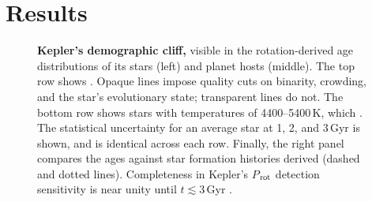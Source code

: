 \documentclass[11pt,twocolumn,tighten]{aastex63}
\begin{document}
\section{Results}
\label{sec:results}

\begin{figure}[!t]
  \begin{center}
    \leavevmode

	\vspace{-0.35cm}
  \end{center}
  \vspace{-0.6cm}
  \caption{{\bf Kepler's demographic cliff,} visible in the
  rotation-derived age distributions of its stars (left) and planet
  hosts (middle).  The top row shows .  Opaque lines
  impose quality cuts on binarity, crowding, and the star's
  evolutionary state; transparent lines do not.  The bottom row shows
  stars with temperatures of 4400--5400\,K, which .  The
  statistical uncertainty for an average star at 1, 2, and 3\,Gyr is
  shown, and is identical across each
  row.  
  Finally, the right panel compares the  ages
  against star formation histories derived  (dashed
  and dotted lines).  Completeness in Kepler's $P$$_{\rm rot}$
  detection sensitivity is near unity until $t$$\lesssim$3\,Gyr
  \citep{2022ApJ...937...94M}.
  \label{fig:hist_tgyro}
  }
\end{figure}
\end{document}
